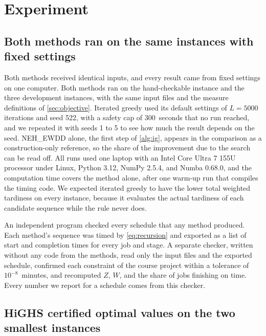 \section{Experiment}\label{sec:experiment}

\subsection{Both methods ran on the same instances with fixed settings}\label{sec:design}

\sumpara Both methods received identical inputs, and every result came from fixed settings on one computer. \sumparaend
\fin Both methods ran on the hand-checkable instance and the three development instances, with the same input files and the measure definitions of \cref{sec:objective}. \fine
\fin Iterated greedy used its default settings of $L = 5000$ iterations and seed 522, with a safety cap of 300~seconds that no run reached, and we repeated it with seeds 1 to 5 to see how much the result depends on the seed. \fine
\fin NEH\_EWDD alone, the first step of \cref{alg:ig}, appears in the comparison as a construction-only reference, so the share of the improvement due to the search can be read off. \fine
\fin All runs used one laptop with an Intel Core Ultra 7 155U processor under Linux, Python 3.12, NumPy 2.5.4, and Numba 0.68.0, and the computation time covers the method alone, after one warm-up run that compiles the timing code. \fine
\fin We expected iterated greedy to have the lower total weighted tardiness on every instance, because it evaluates the actual tardiness of each candidate sequence while the rule never does. \fine

\sumpara An independent program checked every schedule that any method produced. \sumparaend
\fin Each method's sequence was timed by \eqref{eq:recursion} and exported as a list of start and completion times for every job and stage. \fine
\fin A separate checker, written without any code from the methods, read only the input files and the exported schedule, confirmed each constraint of the course project within a tolerance of $10^{-8}$~minutes, and recomputed $Z$, $W$, and the share of jobs finishing on time. \fine
\fin Every number we report for a schedule comes from this checker. \fine

\subsection{HiGHS certified optimal values on the two smallest instances}\label{sec:benchmark-design}

